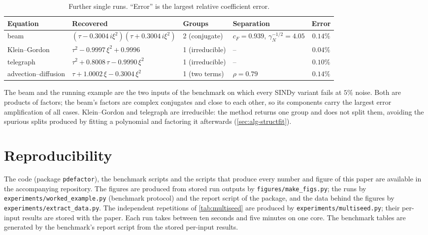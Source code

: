 \documentclass[11pt]{article}
\theoremstyle{plain}
\theoremstyle{definition}
\theoremstyle{remark}
\newcommand{\cF}{c_{F}}                     %
\newcommand{\gN}{\gamma_{N}}                %
\begin{document}
\begin{table}[htbp]
\centering\small
\caption{Further single runs. ``Error'' is the largest relative coefficient error.}\label{tab:cases}
\footnotesize
\begin{tabular}{@{}llllc@{}}
\toprule
Equation & Recovered & Groups & Separation & Error\\
\midrule
beam & $(\tau-0.3004\,i\xi^2)(\tau+0.3004\,i\xi^2)$ & 2 (conjugate) & $\cF=0.939$, $\gN^{-1/2}=4.05$ & $0.14\%$\\
Klein--Gordon & $\tau^2-0.9997\,\xi^2+0.9996$ & 1 (irreducible) & -- & $0.04\%$\\
telegraph & $\tau^2+0.8008\,\tau-0.9990\,\xi^2$ & 1 (irreducible) & -- & $0.10\%$\\
advection--diffusion & $\tau+1.0002\,\xi-0.3004\,\xi^2$ & 1 (two terms) & $\rho=0.79$ & $0.14\%$\\
\bottomrule
\end{tabular}
\end{table}

The beam and the running example are the two inputs of the benchmark on which every SINDy variant fails at
$5\%$ noise. Both are products of factors; the beam's factors are complex conjugates and close to each other,
so its components carry the largest error amplification of all cases. Klein--Gordon and telegraph are irreducible:
the method returns one group and does not split them, avoiding the spurious splits produced by fitting a polynomial and
factoring it afterwards (\cref{sec:alg-structfit}).

\section{Reproducibility}\label{app:repro}
The code (package \texttt{pdefactor}), the benchmark scripts and the scripts that produce every number and figure of
this paper are available in the accompanying repository. The figures are produced from stored run outputs by
\nolinkurl{figures/make_figs.py}; the runs by \nolinkurl{experiments/worked_example.py} (benchmark protocol) and the
report script of the package, and the data behind the figures by \nolinkurl{experiments/extract_data.py}. The independent repetitions of \cref{tab:multiseed} are produced by
\nolinkurl{experiments/multiseed.py}; their per-input results are stored with the paper. Each run
takes between ten seconds and five minutes on one core. The benchmark tables are generated by the benchmark's
report script from the stored per-input results.
\end{document}
